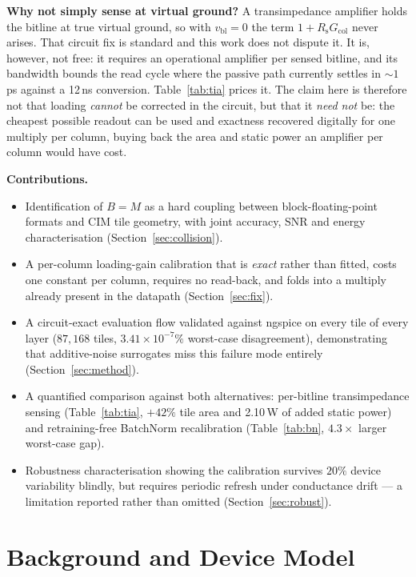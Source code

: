 \documentclass[conference,10pt]{IEEEtran}
\newcommand{\Rs}{R_{\mathrm{s}}}
\newcommand{\Gcol}{G_{\mathrm{col}}}
\begin{document}
\textbf{Why not simply sense at virtual ground?} A transimpedance amplifier
holds the bitline at true virtual ground, so with $v_{\mathrm{bl}}=0$ the term
$1{+}\Rs\Gcol$ never arises. That circuit fix is standard and this work does
not dispute it. It is, however, not free: it requires an operational amplifier
per sensed bitline, and its bandwidth bounds the read cycle where the passive
path currently settles in ${\sim}1$\,ps against a 12\,ns conversion.
Table~\ref{tab:tia} prices it. The claim here is therefore not that loading
\emph{cannot} be corrected in the circuit, but that it \emph{need not} be: the
cheapest possible readout can be used and exactness recovered digitally for one
multiply per column, buying back the area and static power an amplifier per
column would have cost.

\textbf{Contributions.}
\begin{itemize}
\item Identification of $B{=}M$ as a hard coupling between block-floating-point
      formats and CIM tile geometry, with joint accuracy, SNR and energy
      characterisation (Section~\ref{sec:collision}).
\item A per-column loading-gain calibration that is \emph{exact} rather than
      fitted, costs one constant per column, requires no read-back, and folds
      into a multiply already present in the datapath
      (Section~\ref{sec:fix}).
\item A circuit-exact evaluation flow validated against ngspice on every tile
      of every layer ($87{,}168$ tiles, $3.41\!\times\!10^{-7}\%$ worst-case
      disagreement), demonstrating that additive-noise surrogates miss this
      failure mode entirely (Section~\ref{sec:method}).
\item A quantified comparison against both alternatives: per-bitline
      transimpedance sensing (Table~\ref{tab:tia}, $+42\%$ tile area and
      2.10\,W of added static power) and retraining-free BatchNorm
      recalibration (Table~\ref{tab:bn}, $4.3\times$ larger worst-case gap).
\item Robustness characterisation showing the calibration survives $20\%$
      device variability blindly, but requires periodic refresh under
      conductance drift --- a limitation reported rather than omitted
      (Section~\ref{sec:robust}).
\end{itemize}

\section{Background and Device Model}
\label{sec:background}
\end{document}
